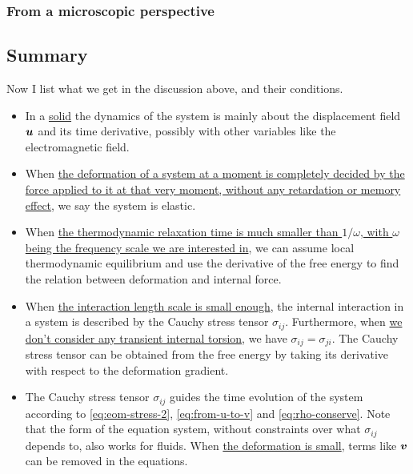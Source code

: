 \documentclass[hyperref, a4paper]{article}
\begin{document}
\subsubsection{From a microscopic perspective}


\subsection{Summary}

Now I list what we get in the discussion above, 
and their conditions.
\begin{itemize}
    \item In a \ul{solid} the dynamics of the system is mainly about the 
        displacement field $\vb*{u}$ and its time derivative,
        possibly with other variables like the electromagnetic field.
    \item When \ul{the deformation of a system at a moment is completely decided by the force applied to 
    it at that very moment, 
    without any retardation or memory effect},
    we say the system is elastic.
    \item When \ul{the thermodynamic relaxation time is much smaller 
    than $1 / \omega$, with $\omega$ being the frequency scale we are interested in},
        we can assume local thermodynamic equilibrium
        and use the derivative of the free energy to find 
        the relation between deformation and internal force.
    \item When \ul{the interaction length scale is small enough}, 
    the internal interaction in a system is described by the Cauchy stress tensor $\sigma_{ij}$.
    Furthermore, when \ul{we don't consider any transient internal torsion}, 
    we have $\sigma_{ij} = \sigma_{ji}$.
    The Cauchy stress tensor can be obtained from the free energy 
    by taking its derivative with respect to the deformation gradient.
    \item The Cauchy stress tensor $\sigma_{ij}$ guides the time evolution of the system 
    according to \eqref{eq:eom-stress-2}, \eqref{eq:from-u-to-v} and \eqref{eq:rho-conserve}.
    Note that the form of the equation system,
    without constraints over what $\sigma_{ij}$ depends to,
    also works for fluids.
    When \ul{the deformation is small},
    terms like $\vb*{v}$ can be removed in the equations.
\end{itemize}
\end{document}
